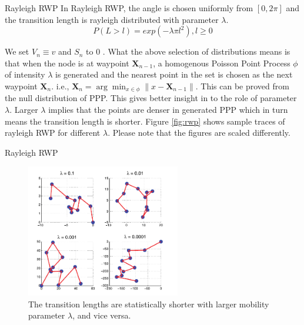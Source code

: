 \documentclass{beamer}
\begin{document}
\begin{frame}{Rayleigh RWP}
In Rayleigh RWP, the angle is chosen uniformly from $[0,2\pi]$ and the transition length is rayleigh distributed with parameter $\lambda$. 
\begin{equation*}
	P(L > l) = exp(-\lambda \pi l^2), l \geq 0
\end{equation*}

We set $V_n\equiv v$ and $S_n$ to 0 . What the above selection of distributions means is 
that when the node is at waypoint $\mathbf{X}_{n-1}$, a homogenous Poisson Point Process $\phi$ of intensity $\lambda$ is generated and the nearest point in the set is chosen as the next waypoint $\mathbf{X}_n$. i.e., $\mathbf{X}_n = \arg \min_{x\in\phi} \| x - \mathbf{X}_{n-1}\|$. This can be proved from the null distribution of PPP. This gives better insight in to the role of parameter $\lambda$. Larger $\lambda$ implies that the points are denser in generated PPP
which in turn means the transition length is shorter. Figure \ref{fig:rwp} shows sample traces
of rayleigh RWP for different $\lambda$. Please note that the figures are scaled differently.

\end{frame}

\begin{frame}{Rayleigh RWP }
\begin{figure}[h]
    \centering \vspace{-0.1in}
    \includegraphics[width=0.6\textwidth]{images/rwpTraces.png}
     \caption[Sample traces of rayleigh RWP mobility model]{\small The transition lengths are statistically shorter with larger mobility parameter $\lambda$, and vice
	versa.\footnotemark}
\end{figure}
\end{frame}
\end{document}
